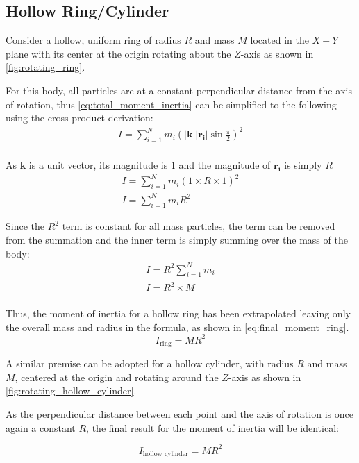 \subsection{Hollow Ring/Cylinder}

Consider a hollow, uniform ring of radius $R$ and mass $M$ located in the $X-Y$ plane with its center at the origin rotating about the $Z$-axis as shown in \cref{fig:rotating_ring}.



For this body, all particles are at a constant perpendicular distance from the axis of rotation, thus \cref{eq:total_moment_inertia} can be simplified to the following using the cross-product derivation:
\begin{gather*}
I = \sum_{i=1}^N m_i (|\bm{k}||\bm{r_i}| \sin{\frac{\pi}{2}})^2\\
\end{gather*}

As $\bm{k}$ is a unit vector, its magnitude is $1$ and the magnitude of $\bm{r_i}$ is simply $R$  \begin{gather*}  
I = \sum_{i=1}^N m_i (1 \times R \times 1)^2 \\
I = \sum_{i=1}^N m_i R^2
\end{gather*}

Since the $R^2$ term is constant for all mass particles, the term can be removed from the summation and the inner term is simply summing over the mass of the body:
\begin{align*}
I = R^2\sum_{i=1}^N m_i \\
I = R^2 \times M \\
\end{align*}

Thus, the moment of inertia for a hollow ring has been extrapolated leaving only the overall mass and radius in the formula, as shown in \cref{eq:final_moment_ring}.
\begin{equation}
I_{\text{ring}} = MR^2
\label{eq:final_moment_ring}
\end{equation}

A similar premise can be adopted for a hollow cylinder, with radius $R$ and mass $M$, centered at the origin and rotating around the $Z$-axis as shown in \cref{fig:rotating_hollow_cylinder}.



As the perpendicular distance between each point and the axis of rotation is once again a constant $R$, the final result for the moment of inertia will be identical:

\begin{equation}
I_{\text{hollow cylinder}} = MR^2
\label{eq:final_moment_hollow_cylinder}
\end{equation}